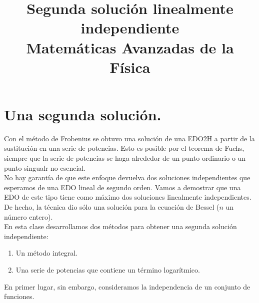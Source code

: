
\newcommand{\doblederivaday}{y^{\prime \prime}}
\newcommand{\derivaday}{y^{\prime}}
\title{Segunda solución linealmente independiente \\ \large {Matemáticas Avanzadas de la Física}}
\date{}

\renewcommand\labelenumii{\theenumi.{\arabic{enumii}}}
\maketitle
\fontsize{14}{14}\selectfont
\section{Una segunda solución.}
Con el método de Frobenius se obtuvo una solución de una EDO2H a partir de la sustitución en una serie de potencias. Esto es posible por el teorema de Fuchs, siempre que la serie de potencias se haga alrededor de un punto ordinario o un punto singualr no esencial.
\\
No hay garantía de que este enfoque devuelva dos soluciones independientes que esperamos de una EDO lineal de segundo orden. Vamos a demostrar que una EDO de este tipo tiene como máximo dos soluciones linealmente independientes. De hecho, la técnica dio sólo una solución para la ecuación de Bessel ($n$ un número entero).
\\
En esta clase desarrollamos dos métodos para obtener una segunda solución independiente: \begin{enumerate}
\item Un método integral.
\item Una serie de potencias que contiene un término logarítmico.
\end{enumerate}
En primer lugar, sin embargo, consideramos la independencia de un conjunto de funciones.
